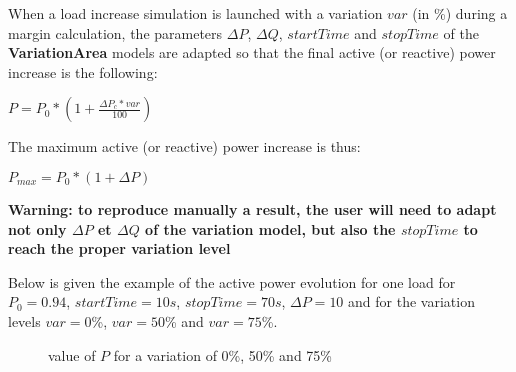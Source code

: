 \documentclass[a4paper, 12pt]{report}
\begin{document}
When a load increase simulation is launched with a variation $var$ (in \%) during a margin calculation, 
the parameters $\Delta P$, $\Delta Q$, $startTime$ and $stopTime$ of the \textbf{VariationArea} models are adapted so that the final 
active (or reactive) power increase is the following:

\begin{center}
$P = P_0*(1+\frac{\Delta P_c*var}{100}) $
\end{center}

The maximum active (or reactive) power increase is thus:
\begin{center}
$P_{max} = P_0*(1+\Delta P) $\\
\end{center}

\textbf{Warning: to reproduce manually a result, the user will need to adapt not only $\Delta P$ et $\Delta Q$ of the variation model, but also the $stopTime$ 
to reach the proper variation level}

Below is given the example of the active power evolution for one load for $P_0 = 0.94$, $startTime = 10s$, $stopTime=70s$, $\Delta P = 10$ 
and for the variation levels  $var=0$\%, $var=50$\% and $var=75$\%.

\begin{center}
\begin{figure}[H]
\caption{value of $P$ for a variation of 0\%, 50\% and 75\%}
\end{figure}
\end{center}
\end{document}
